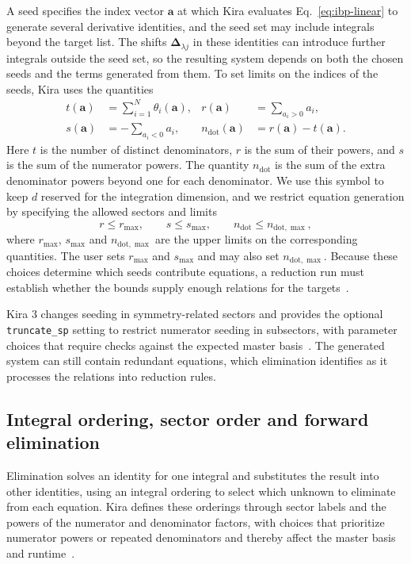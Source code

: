 A seed specifies the index vector $\boldsymbol a$ at which Kira evaluates
Eq.~\eqref{eq:ibp-linear} to generate several derivative identities, and
the seed set may include integrals beyond the target list. The shifts
$\boldsymbol\Delta_{\lambda j}$ in these identities can introduce further
integrals outside the seed set, so the resulting system depends on both
the chosen seeds and the terms generated from them. To set limits on the
indices of the seeds, Kira uses the quantities
\begin{align}
 t(\boldsymbol a)&=\sum_{i=1}^{N}\theta_i(\boldsymbol a),
 &r(\boldsymbol a)&=\sum_{a_i>0}a_i,\\
 s(\boldsymbol a)&=-\sum_{a_i<0}a_i,
 &n_{\mathrm{dot}}(\boldsymbol a)&=r(\boldsymbol a)-t(\boldsymbol a).
 \label{eq:complexities}
\end{align}
Here $t$ is the number of distinct denominators, $r$ is the sum of their
powers, and $s$ is the sum of the numerator powers. The quantity
$n_{\mathrm{dot}}$ is the sum of the extra denominator powers beyond
one for each denominator. We use this symbol to keep $d$ reserved for the
integration dimension, and we restrict equation generation by specifying
the allowed sectors and limits
\begin{equation}
 r\leq r_{\max},\qquad s\leq s_{\max},\qquad
 n_{\mathrm{dot}}\leq n_{\mathrm{dot},\max},
 \label{eq:seed-bounds}
\end{equation}
where $r_{\max}$, $s_{\max}$ and $n_{\mathrm{dot},\max}$ are the upper
limits on the corresponding quantities. The user sets $r_{\max}$ and
$s_{\max}$ and may also set $n_{\mathrm{dot},\max}$. Because these choices determine which seeds
contribute equations, a reduction run must establish whether the bounds
supply enough relations for the targets~\cite{Kira12}.

Kira 3 changes seeding in symmetry-related sectors and provides the optional
\texttt{truncate\_sp} setting to restrict numerator seeding in subsectors,
with parameter choices that require checks against the expected master
basis~\cite{Kira3}. The generated system can still contain redundant
equations, which elimination identifies as it processes the relations
into reduction rules.

\subsection{Integral ordering, sector order and forward elimination}
Elimination solves an identity for one integral and substitutes the result
into other identities, using an integral ordering to select which unknown
to eliminate from each equation. Kira defines these orderings through
sector labels and the powers of the numerator and denominator factors,
with choices that prioritize numerator powers or repeated denominators
and thereby affect the master basis and
runtime~\cite{Kira12}.

